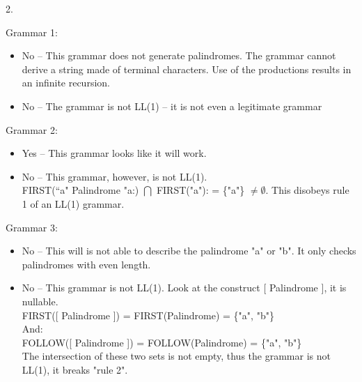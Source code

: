 \documentclass[a4paper,12pt]{article}
\newlength{\QNo}
\begin{document}
2. 
\begin{minipage}[t]{0.95\dimexpr\textwidth}
  Grammar 1:\\
  \begin{minipage}[t]{0.9\dimexpr\textwidth}
    \begin{itemize}
    \item
    No -- This grammar does not generate palindromes. The grammar cannot derive a string made of terminal characters. Use of the productions results in an infinite recursion.
    \item
    No -- The grammar is not LL(1) -- it is not even a legitimate grammar\\
    \end{itemize}
  \end{minipage}

  Grammar 2:\\
  \begin{minipage}[t]{0.9\dimexpr\textwidth-\QNo}
    \begin{itemize}
    \item
    Yes -- This grammar looks like it will work.
    \item
    No -- This grammar, however, is not LL(1).\\
    FIRST(``a" Palindrome "a:) $\bigcap$ FIRST("a"): = \{"a"\} $\neq \emptyset$.
    This disobeys rule 1 of an LL(1) grammar.\\
    \end{itemize}
  \end{minipage}

  Grammar 3:\\
  \begin{minipage}[t]{0.9\dimexpr\textwidth-\QNo}
    \begin{itemize}
    \item
    No -- This will is not able to describe the palindrome "a" or "b". It only checks palindromes with even length.
    \item
    No -- This grammar is not LL(1). 
    Look at the construct [ Palindrome ], it is nullable.\\
    FIRST([ Palindrome ]) = FIRST(Palindrome) = \{"a", "b"\}\\
    And:\\
    FOLLOW([ Palindrome ]) = FOLLOW(Palindrome) = \{"a", "b"\}\\
    The intersection of these two sets is not empty, thus the grammar is not LL(1), it breaks "rule 2".\\
    \end{itemize}
  \end{minipage}


\end{minipage}
\end{document}
